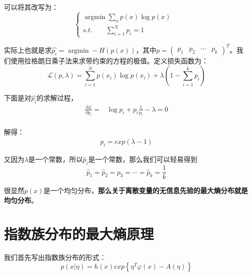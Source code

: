 \documentclass[a4paper]{article}
\DeclareMathOperator*{\argmin}{argmin}
\begin{document}
可以将其改写为：
\begin{equation}
    \left\{
    \begin{array}{ll}
          \mathop{\argmin} \sum_x p(x)\log p(x) & \\
         s.t. \qquad \sum_{i=1}^Np_i=1 &
    \end{array}
    \right.
\end{equation}

实际上也就是求$\hat{p_i} = \mathop{\argmin} -H(p(x))$，其中$p=\begin{pmatrix} p_1 & p_2 & \cdots & p_k \end{pmatrix}^T$。我们使用拉格朗日乘子法来求带约束的方程的极值。定义损失函数为：
\begin{equation}
    \mathcal{L}(p,\lambda) = \sum_{i=1}^N p(x_i)\log p(x_i) + \lambda(1-\sum_{i=1}^k p_i)
\end{equation}

下面是对$\hat{p_i}$的求解过程，
\begin{equation}
    \begin{split}
        \frac{\partial \mathcal{L}}{\partial p_i} = & \log p_i + p_i \frac{1}{p_i} - \lambda = 0 \\
    \end{split}
\end{equation}

解得：
\begin{equation}
    \begin{split}
        p_i = exp(\lambda-1)
    \end{split}
\end{equation}

又因为$\lambda$是一个常数，所以$\hat{p}_i$是一个常数，那么我们可以轻易得到
\begin{equation}
    \hat{p}_1 = \hat{p}_2 = \hat{p}_3 = \cdots = \hat{p}_k = \frac{1}{k}
\end{equation}

很显然$p(x)$是一个均匀分布，\textbf{那么关于离散变量的无信息先验的最大熵分布就是均匀分布}。

\section{指数族分布的最大熵原理}

我们首先写出指数族分布的形式：
\begin{equation}
    p(x|\eta)=h(x)exp\left\{ \eta^T\varphi(x)-A(\eta) \right\}
\end{equation}
\end{document}

